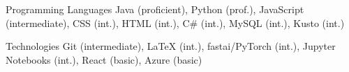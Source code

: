 


\begin{cvskills}


\cvskill
{Programming Languages} %
{Java (proficient), Python (prof.), JavaScript (intermediate), CSS (int.), HTML (int.), C\# (int.), MySQL (int.), Kusto (int.)} %



\cvskill
{Technologies} %
{Git (intermediate),  \textrm{\LaTeX} (int.),
fastai/PyTorch (int.), Jupyter Notebooks (int.), React (basic), Azure (basic)} %





\end{cvskills}